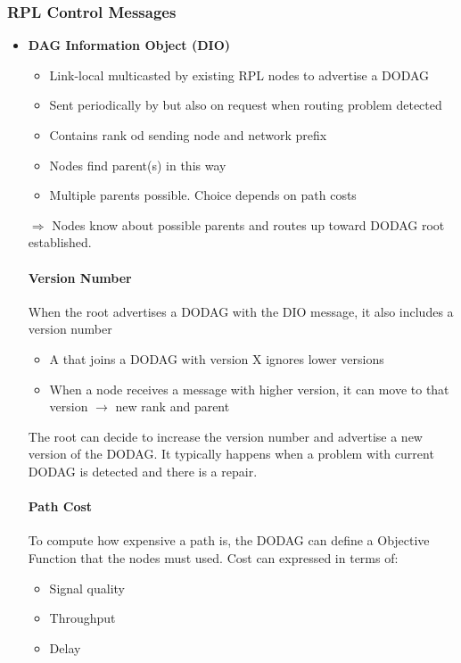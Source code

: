 \subsubsection{RPL Control Messages}
\begin{itemize}
    \item \textbf{DAG Information Object (DIO)}
        \begin{itemize}
            \item Link-local multicasted by existing RPL nodes to advertise a DODAG
            \item Sent periodically by but also on request when routing problem detected
            \item Contains rank od sending node and network prefix
            \item Nodes find parent(s) in this way
            \item Multiple parents possible. Choice depends on path costs
        \end{itemize}
        $\Rightarrow$ Nodes know about possible parents and routes up toward DODAG root
        established.

        \paragraph{Version Number} When the root advertises a DODAG with
        the DIO message, it also includes a version number
        \begin{itemize}
            \item A that joins a DODAG with version X ignores lower versions
            \item When a node receives a message with higher version, it can move to that 
                version $\to$ new rank and parent
        \end{itemize}

        The root can decide to increase the version number and advertise
        a new version of the DODAG. It typically happens when a problem
        with current DODAG is detected and there is a repair.

        \paragraph{Path Cost} To compute how expensive a path is, the
        DODAG can define a Objective Function that the nodes must used.
        Cost can expressed in terms of:
        \begin{itemize}
            \item Signal quality
            \item Throughput
            \item Delay
        \end{itemize}


\end{itemize}
